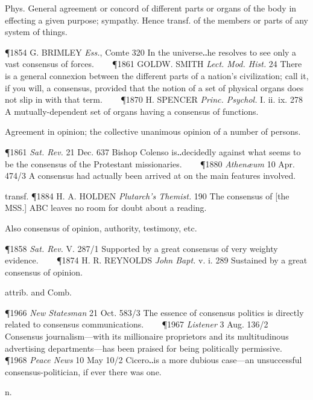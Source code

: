 \begin{description}[wide, labelwidth=!, labelindent=0pt]
\begin{myenumerate}

 Phys. General agreement or concord of different parts or organs of the body in effecting a given purpose; sympathy. Hence transf. of the members or parts of any system of things.

\P 1854 G. BRIMLEY  \textit{Ess.}, Comte 320 In the universe‥he resolves to see only a vast consensus of forces.    
\P 1861 GOLDW.  SMITH \textit{Lect. Mod. Hist.} 24 There is a general connexion between the different parts of a nation's civilization; call it, if you will, a consensus, provided that the notion of a set of physical organs does not slip in with that term.    
\P 1870 H. SPENCER  \textit{Princ. Psychol.} I. ii. ix. 278 A mutually-dependent set of organs having a consensus of functions.

 Agreement in opinion; the collective unanimous opinion of a number of persons.

\P 1861  \textit{Sat. Rev.} 21 Dec. 637 Bishop Colenso is‥decidedly against what seems to be the consensus of the Protestant missionaries.    
\P 1880 \textit{Athenæum}  10 Apr. 474/3 A consensus had actually been arrived at on the main features involved.

transf. \P 1884 H. A. HOLDEN  \textit{Plutarch's Themist.} 190 The consensus of [the MSS.] ABC leaves no room for doubt about a reading.

 Also consensus of opinion, authority, testimony, etc.

\P 1858  \textit{Sat. Rev.} V. 287/1 Supported by a great consensus of very weighty evidence.    
\P 1874 H. R. REYNOLDS  \textit{John Bapt.} v. i. 289 Sustained by a great consensus of opinion.

 attrib. and Comb.

\P 1966  \textit{New Statesman} 21 Oct. 583/3 The essence of consensus politics is directly related to consensus communications.    
\P 1967 \textit{Listener}  3 Aug. 136/2 Consensus journalism—with its millionaire proprietors and its multitudinous advertising departments—has been praised for being politically permissive.    
\P 1968 \textit{Peace  News} 10 May 10/2 Cicero‥is a more dubious case—an unsuccessful consensus-politician, if ever there was one.
\end{myenumerate}


 n.

\noindent {}


\end{description}
